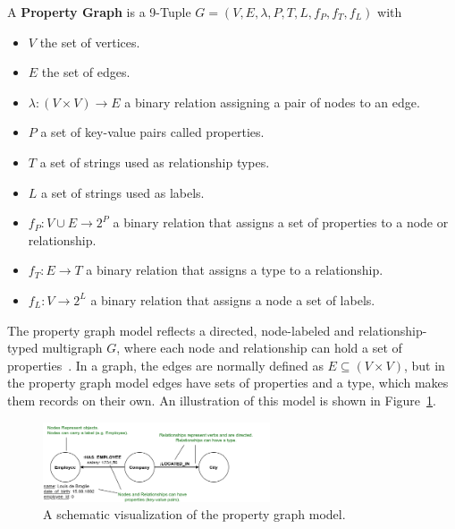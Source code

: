        A \textbf{Property Graph} is a 9-Tuple $G = (V, E, \lambda, P, T, L, f_P, f_T, f_L)$ with 
        \begin{itemize}
            \item $V$ the set of vertices.
            \item $E$ the set of edges.
            \item $\lambda: (V \times V) \rightarrow E$ a binary relation assigning a pair of nodes to an edge.
            \item $P$ a set of key-value pairs called properties.
            \item $T$ a set of strings used as relationship types.
            \item $L$ a set of strings used as labels.
            \item $f_P: V \cup E \rightarrow 2^P$ a binary relation that assigns a set of properties to a node or relationship.
            \item $f_T: E \rightarrow T$ a binary relation that assigns a type to a relationship.
            \item  $f_L: V \rightarrow 2^L$ a binary relation that assigns a node a set of labels.
        \end{itemize} 
        \smallskip
        The property graph model reflects a directed, node-labeled and relationship-typed multigraph $G$, where each node and relationship can hold a set of properties~\cite{angles2018property, rodriguez2012graph, Rodriguez2010ConstructionsFD}.
        In a graph, the edges are normally defined as $E \subseteq (V \times V)$, but in the property graph model edges have sets of properties and a type, which makes them records on their own. 
        An illustration of this model is shown in Figure~\ref{propertygraph}.
        
        \begin{figure}[htp]
            \begin{center}
                \includegraphics[keepaspectratio,width=0.6\textwidth]{img/04-databases/property_graph_elements.png}
            \end{center}
            \caption{A schematic visualization of the property graph model.} 
            \label{propertygraph}
        \end{figure}

